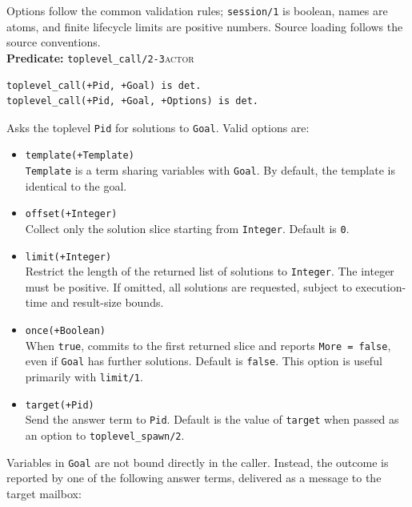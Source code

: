 Options follow the common validation rules; \texttt{session/\allowbreak{}1} is boolean, names are atoms, and
finite lifecycle limits are positive numbers. Source loading follows the source conventions.\\


\noindent \textbf{Predicate:} \texttt{toplevel\_\allowbreak{}call/\allowbreak{}2-3}\hfill\textsc{actor}

\begin{verbatim}
toplevel_call(+Pid, +Goal) is det.
toplevel_call(+Pid, +Goal, +Options) is det.
\end{verbatim}

\noindent Asks the toplevel \texttt{Pid} for solutions to \texttt{Goal}. Valid
options are:

\begin{itemize}
\item
  \texttt{template(\allowbreak{}+Template)}\\
  \texttt{Template} is a term sharing variables with \texttt{Goal}. By
  default, the template is identical to the goal.
\item
  \texttt{offset(\allowbreak{}+Integer)}\\
  Collect only the solution slice starting from \texttt{Integer}. Default
  is \texttt{0}.
\item
  \texttt{limit(\allowbreak{}+Integer)}\\
  Restrict the length of the returned list of solutions to \texttt{Integer}.
  The integer must be positive. If omitted, all solutions are requested,
  subject to execution-time and result-size bounds.
\item
  \texttt{once(\allowbreak{}+Boolean)}\\
  When \texttt{true}, commits to the first returned slice and reports
  \texttt{More = false}, even if \texttt{Goal} has further solutions. Default
  is \texttt{false}. This option is useful primarily with \texttt{limit/\allowbreak{}1}.
\item
  \texttt{target(\allowbreak{}+Pid)}\\
  Send the answer term to \texttt{Pid}. Default is the value of
  \texttt{target} when passed as an option to \texttt{toplevel\_\allowbreak{}spawn/\allowbreak{}2}.
\end{itemize}

\noindent Variables in \texttt{Goal} are not bound directly in the caller.
Instead, the outcome is reported by one of the following answer terms,
delivered as a message to the target mailbox:

